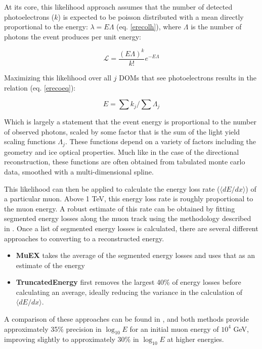 At its core, this likelihood approach assumes that the number of detected photoelectrons ($k$) is expected to be poisson distributed with a mean directly proportional to the energy: $\lambda=E \Lambda$ (eq. \ref{erecolh}), where $\Lambda$ is the number of photons the event produces per unit energy:

\begin{equation}
    \mathcal{L} = \frac{(E \Lambda)^k}{k!} e ^ {-E \Lambda}
\label{erecolh}
\end{equation}

Maximizing this likelihood over all $j$ DOMs that see photoelectrons results in the relation (eq. \ref{erecoeq}):

\begin{equation}
    E = \sum{k_j}/\sum{\Lambda_j}
\label{erecoeq}
\end{equation}

Which is largely a statement that the event energy is proportional to the number of observed photons, scaled by some factor that is the sum of the light yield scaling functions $\Lambda_j$. These functions depend on a variety of factors including the geometry and ice optical properties. Much like in the case of the directional reconstruction, these functions are often obtained from tabulated monte carlo data, smoothed with a multi-dimensional spline. 

This likelihood can then be applied to calculate the energy loss rate ($\langle dE/dx \rangle$) of a particular muon. Above 1 TeV, this energy loss rate is roughly proportional to the muon energy. A robust estimate of this rate can be obtained by fitting segmented energy losses along the muon track using the methodology described in \cite{erecopaper}. Once a list of segmented energy losses is calculated, there are several different approaches to converting to a reconstructed energy. 

\begin{itemize}
    \item \textbf{MuEX} takes the average of the segmented energy losses and uses that as an estimate of the energy
    \item \textbf{TruncatedEnergy} first removes the largest 40\% of energy losses before calculating an average, ideally reducing the variance in the calculation of $\langle dE/dx \rangle$. 
\end{itemize}

A comparison of these approaches can be found in \cite{erecopaper}, and both methods provide approximately 35\% precision in $\log_{10}E$ for an initial muon energy of $10^4$ GeV, improving slightly to approximately 30\% in $\log_{10}E$ at higher energies. 

